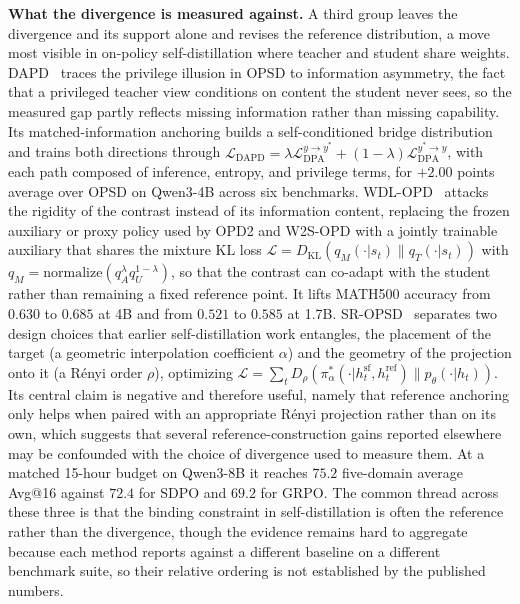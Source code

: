 \documentclass{article} %
\newcommand{\KL}{D_{\mathrm{KL}}}
\newcommand{\ptheta}{p_\theta}
\newcommand{\loss}{\mathcal{L}}
\begin{document}
\textbf{What the divergence is measured against.} A third group leaves the divergence and its support alone and revises the reference distribution, a move most visible in on-policy self-distillation where teacher and student share weights. DAPD~\citep{2608.01735} traces the privilege illusion in OPSD to information asymmetry, the fact that a privileged teacher view conditions on content the student never sees, so the measured gap partly reflects missing information rather than missing capability. Its matched-information anchoring builds a self-conditioned bridge distribution and trains both directions through $\loss_{\mathrm{DAPD}} = \lambda \loss^{y \to y^*}_{\mathrm{DPA}} + (1-\lambda) \loss^{y^* \to y}_{\mathrm{DPA}}$, with each path composed of inference, entropy, and privilege terms, for $+2.00$ points average over OPSD on Qwen3-4B across six benchmarks. WDL-OPD~\citep{2608.09447} attacks the rigidity of the contrast instead of its information content, replacing the frozen auxiliary or proxy policy used by OPD2 and W2S-OPD with a jointly trainable auxiliary that shares the mixture KL loss $\loss = \KL(q_M(\cdot|s_t) \parallel q_T(\cdot|s_t))$ with $q_M = \mathrm{normalize}(q_A^\lambda q_U^{1-\lambda})$, so that the contrast can co-adapt with the student rather than remaining a fixed reference point. It lifts MATH500 accuracy from $0.630$ to $0.685$ at 4B and from $0.521$ to $0.585$ at 1.7B. SR-OPSD~\citep{2608.09745} separates two design choices that earlier self-distillation work entangles, the placement of the target (a geometric interpolation coefficient $\alpha$) and the geometry of the projection onto it (a Rényi order $\rho$), optimizing $\loss = \sum_t D_\rho(\pi^*_\alpha(\cdot|h^{\mathrm{sf}}_t, h^{\mathrm{ref}}_t) \parallel \ptheta(\cdot|h_t))$. Its central claim is negative and therefore useful, namely that reference anchoring only helps when paired with an appropriate Rényi projection rather than on its own, which suggests that several reference-construction gains reported elsewhere may be confounded with the choice of divergence used to measure them. At a matched 15-hour budget on Qwen3-8B it reaches $75.2$ five-domain average Avg@16 against $72.4$ for SDPO and $69.2$ for GRPO. The common thread across these three is that the binding constraint in self-distillation is often the reference rather than the divergence, though the evidence remains hard to aggregate because each method reports against a different baseline on a different benchmark suite, so their relative ordering is not established by the published numbers.
\end{document}
